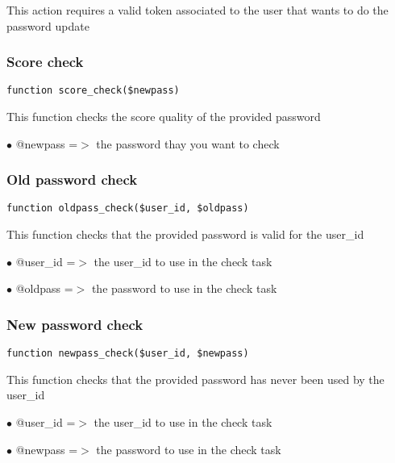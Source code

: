 \documentclass[a4paper]{article}
\begin{document}
This action requires a valid token associated to the user that wants to do
the password update

\hypertarget{toc380}{}
\subsubsection{Score check}

\begin{lstlisting}
function score_check($newpass)
\end{lstlisting}

This function checks the score quality of the provided password

\begin{compactitem}
\item[\color{myblue}$\bullet$] @newpass =$>$ the password thay you want to check
\end{compactitem}

\hypertarget{toc381}{}
\subsubsection{Old password check}

\begin{lstlisting}
function oldpass_check($user_id, $oldpass)
\end{lstlisting}

This function checks that the provided password is valid for the user\_id

\begin{compactitem}
\item[\color{myblue}$\bullet$] @user\_id =$>$ the user\_id to use in the check task
\item[\color{myblue}$\bullet$] @oldpass =$>$ the password to use in the check task
\end{compactitem}

\hypertarget{toc382}{}
\subsubsection{New password check}

\begin{lstlisting}
function newpass_check($user_id, $newpass)
\end{lstlisting}

This function checks that the provided password has never been used by the user\_id

\begin{compactitem}
\item[\color{myblue}$\bullet$] @user\_id =$>$ the user\_id to use in the check task
\item[\color{myblue}$\bullet$] @newpass =$>$ the password to use in the check task
\end{compactitem}
\end{document}
